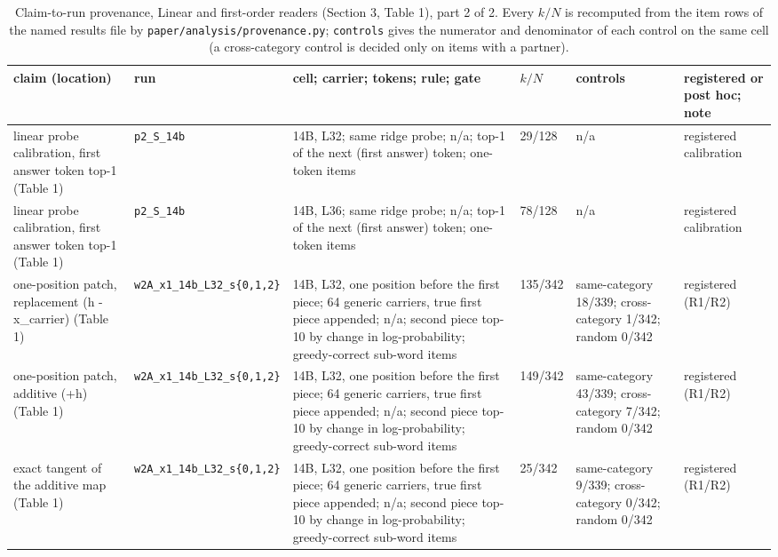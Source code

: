 \begin{table}[t]
\centering
\small
\setlength{\tabcolsep}{1mm}
\begin{tabular}{@{}p{2.5cm}p{2.3cm}p{4.5cm}p{1.3cm}p{3.0cm}p{2.9cm}@{}}
\toprule
claim (location) & run & cell; carrier; tokens; rule; gate & $k/N$ & controls & registered or post hoc; note \\
\midrule
linear probe calibration, first answer token top-1 (Table 1) & \texttt{p2\_\allowbreak{{}}S\_\allowbreak{{}}14b} & 14B, L32; same ridge probe; n/a; top-1 of the next (first answer) token; one-token items & 29/128 & n/a & registered calibration \\
linear probe calibration, first answer token top-1 (Table 1) & \texttt{p2\_\allowbreak{{}}S\_\allowbreak{{}}14b} & 14B, L36; same ridge probe; n/a; top-1 of the next (first answer) token; one-token items & 78/128 & n/a & registered calibration \\
one-position patch, replacement (h - x\_carrier) (Table 1) & \texttt{w2A\_\allowbreak{{}}x1\_\allowbreak{{}}14b\_\allowbreak{{}}L32\_\allowbreak{{}}s\{0,1,2\}} & 14B, L32, one position before the first piece; 64 generic carriers, true first piece appended; n/a; second piece top-10 by change in log-probability; greedy-correct sub-word items & 135/342 & same-category 18/339; cross-category 1/342; random 0/342 & registered (R1/R2) \\
one-position patch, additive (+h) (Table 1) & \texttt{w2A\_\allowbreak{{}}x1\_\allowbreak{{}}14b\_\allowbreak{{}}L32\_\allowbreak{{}}s\{0,1,2\}} & 14B, L32, one position before the first piece; 64 generic carriers, true first piece appended; n/a; second piece top-10 by change in log-probability; greedy-correct sub-word items & 149/342 & same-category 43/339; cross-category 7/342; random 0/342 & registered (R1/R2) \\
exact tangent of the additive map (Table 1) & \texttt{w2A\_\allowbreak{{}}x1\_\allowbreak{{}}14b\_\allowbreak{{}}L32\_\allowbreak{{}}s\{0,1,2\}} & 14B, L32, one position before the first piece; 64 generic carriers, true first piece appended; n/a; second piece top-10 by change in log-probability; greedy-correct sub-word items & 25/342 & same-category 9/339; cross-category 0/342; random 0/342 & registered (R1/R2) \\
\bottomrule
\end{tabular}
\caption{Claim-to-run provenance, Linear and first-order readers (Section 3, Table 1), part 2 of 2. Every $k/N$ is recomputed from the item rows of the named results file by \texttt{paper/analysis/provenance.py}; \texttt{controls} gives the numerator and denominator of each control on the same cell (a cross-category control is decided only on items with a partner).}
\end{table}

